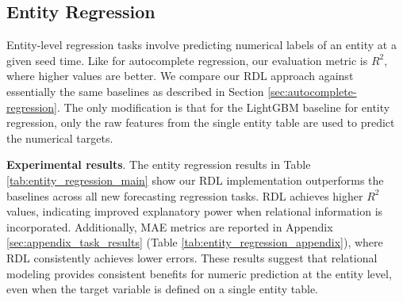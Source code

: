 \documentclass{article} %
\newcommand{\relbench}{\textsc{RelBench}\xspace}
\begin{document}
\begin{table}[t]
  \centering
  \caption{{\bf Entity binary classification results on \relbench.} Binary classification uses the AUROC metric (higher is better). Best values are in bold. Standard baselines of random choice and majority class both correspond to AUROC values of approximately $50.00$, so we exclude them below. See Table \ref{tab:entity_classification_appendix} for standard deviations.}
  \label{tab:entity_classification_main}
  \renewcommand{\arraystretch}{1.1}
  \vspace{-5pt}
  \scriptsize
    \begin{adjustbox}{max width=0.6\textwidth, center}
    
    \end{adjustbox}
\end{table}

\begin{table}[t]
  \centering
  \caption{{\bf Entity multiclass classification results on \relbench.} Multiclass classification uses the accuracy metric (higher is better). Best values are in bold. See Table \ref{tab:entity_multiclass_appendix} for standard deviations.}
  \label{tab:entity_multiclass_main}
  \renewcommand{\arraystretch}{1.1}
  \scriptsize
  \vspace{-5pt}
    \begin{adjustbox}{max width=0.65\textwidth, center}
    
    \end{adjustbox}
  \vspace{-10pt}
\end{table}


\subsection{Entity Regression}

Entity-level regression tasks involve predicting numerical labels of an entity at a given seed time. Like for autocomplete regression, our evaluation metric is $R^2$, where higher values are better. We compare our RDL approach against essentially the same baselines as described in Section \ref{sec:autocomplete-regression}. The only modification is that for the LightGBM baseline for entity regression, only the raw features from the single entity table are used to predict the numerical targets.

\textbf{Experimental results}. The entity regression results in Table \ref{tab:entity_regression_main} show our RDL implementation outperforms the
baselines across all new forecasting regression tasks. RDL achieves higher $R^2$ values, indicating improved explanatory power when relational information is incorporated. Additionally, MAE metrics are reported in Appendix \ref{sec:appendix_task_results} (Table \ref{tab:entity_regression_appendix}), where RDL consistently achieves lower errors. These results suggest that relational modeling provides consistent benefits for numeric prediction at the entity level, even when the target variable is defined on a single entity table.
\end{document}
